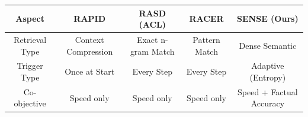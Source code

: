 \begin{table}
\centering
\begin{tabular}{|c|c|c|c|c|}
\hline
\textbf{Aspect} & \textbf{RAPID} & \textbf{RASD (ACL)} & \textbf{RACER} & \textbf{SENSE (Ours)} \\
\hline
Retrieval Type & Context Compression & Exact n-gram Match & Pattern Match & Dense Semantic \\
Trigger Type & Once at Start & Every Step & Every Step & Adaptive (Entropy) \\
Co-objective & Speed only & Speed only & Speed only & Speed + Factual Accuracy \\
\hline
\end{tabular}
\end{table}